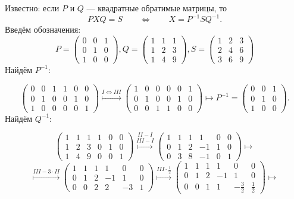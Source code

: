 \documentclass[a4paper,12pt]{article}
\begin{document}
\vspace{5pt}

 Известно: если $P$ и $Q$ --- квадратные обратимые матрицы, то 
$$PXQ=S \qquad \Leftrightarrow \qquad X=P^{-1}SQ^{-1}.$$ 
Введём обозначения:
$$
P=\begin{pmatrix}
0&0&1\\
0&1&0\\
1&0&0
\end{pmatrix},
Q=
\begin{pmatrix}
1&1&1\\
1&2&3\\
1&4&9
\end{pmatrix},
S=
\begin{pmatrix}
1&2&3\\
2&4&6\\
3&6&9
\end{pmatrix}
$$
Найдём $P^{-1}$: \par
$$ 
\left(
\begin{array}{ccc|ccc}
0&0&1&1&0&0\\
0&1&0&0&1&0\\
1&0&0&0&0&1
\end{array}
\right)
\overset{I \Leftrightarrow III}{\longmapsto}
\left(
\begin{array}{ccc|ccc}
1&0&0&0&0&1\\
0&1&0&0&1&0\\
0&0&1&1&0&0
\end{array}
\right)
\longmapsto
P^{-1}=
\left(
\begin{array}{ccc}
0&0&1\\
0&1&0\\
1&0&0
\end{array}
\right).
$$
Найдём $Q^{-1}$: \par
$$\left(
\begin{array}{ccc|ccc}
1&1&1&1&0&0\\
1&2&3&0&1&0\\
1&4&9&0&0&1
\end{array}
\right)
\overset{II - I}{\overset{III - I}{\longmapsto}}
\left(
\begin{array}{ccc|ccc}
1&1&1&1&0&0\\
0&1&2&-1&1&0\\
0&3&8&-1&0&1
\end{array}
\right)
\longmapsto
$$
$$ 
\overset{III - 3\cdot II}{\longmapsto}
\left(
\begin{array}{ccc|ccc}
1&1&1&1&0&0\\
0&1&2&-1&1&0\\
0&0&2&2&-3&1
\end{array}
\right)
\overset{III\cdot \frac{1}{2}}{\longmapsto}
\left(
\begin{array}{ccc|ccc}
1&1&1&1&0&0\\
0&1&2&-1&1&0\\
0&0&1&1& -\frac{3}{2}&\frac{1}{2}
\end{array}
\right)
\longmapsto
$$
\end{document}
